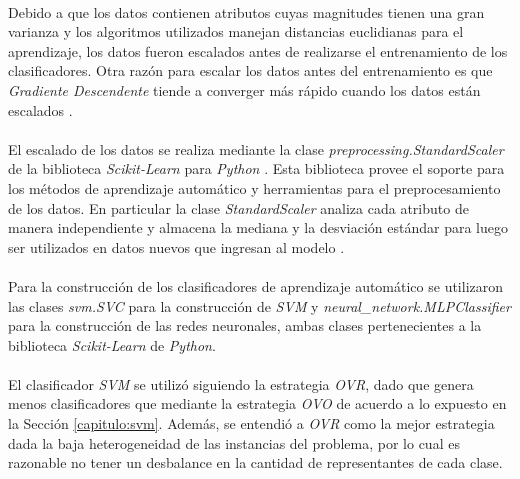 \paragraph{} Debido a que los datos contienen atributos cuyas magnitudes tienen una gran varianza y los algoritmos utilizados manejan distancias euclidianas para el aprendizaje, los datos fueron escalados antes de realizarse el entrenamiento de los clasificadores.
Otra razón para escalar los datos antes del entrenamiento es que \textit{Gradiente Descendente} tiende a converger más rápido cuando los datos están escalados \cite{gradiente-descendente-escalado}.

\paragraph{} El escalado de los datos se realiza mediante la clase \textit{preprocessing.StandardScaler} de la biblioteca \textit{Scikit-Learn} para \textit{Python} \cite{scikit-learn}.
Esta biblioteca provee el soporte para los métodos de aprendizaje automático y herramientas para el preprocesamiento de los datos.
En particular la clase \textit{StandardScaler} analiza cada atributo de manera independiente y almacena la mediana y la desviación estándar para luego ser utilizados en datos nuevos que ingresan al modelo \cite{StandardScaler-scikit-learn}.

\paragraph{} Para la construcción de los clasificadores de aprendizaje automático se utilizaron las clases \textit{svm.SVC} para la construcción de \textit{SVM} y \textit{neural\_network.MLPClassifier} para la construcción de las redes neuronales, ambas clases pertenecientes a la biblioteca \textit{Scikit-Learn} de \textit{Python}.

\paragraph{} El clasificador \textit{SVM} se utilizó siguiendo la estrategia \textit{OVR}, dado que genera menos clasificadores que mediante la estrategia \textit{OVO} de acuerdo a lo expuesto en la Sección \ref{capitulo:svm}.
Además, se entendió a \textit{OVR} como la mejor estrategia dada la baja heterogeneidad de las instancias del problema, por lo cual es razonable no tener un desbalance en la cantidad de representantes de cada clase.

